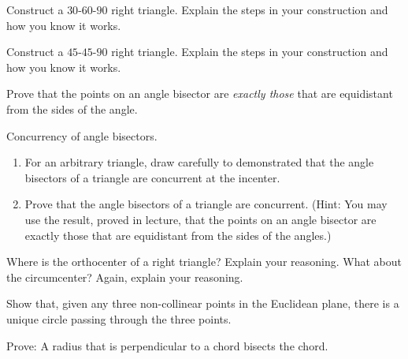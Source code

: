 
\begin{prob}
Construct a $30$-$60$-$90$ right triangle. Explain the steps in your
  construction and how you know it works.
\end{prob}

\begin{prob}
Construct a $45$-$45$-$90$ right triangle. Explain the steps in your
  construction and how you know it works.
\end{prob}

\begin{prob}
Prove that the points on an angle bisector are \emph{exactly those} that are equidistant from the sides of the angle. 
\end{prob}

\begin{prob} 
Concurrency of angle bisectors. 
\begin{enumerate}
\item For an arbitrary triangle, draw carefully to demonstrated that the angle bisectors of a triangle are concurrent at the incenter.   
\item Prove that the angle bisectors of a triangle are concurrent.  (Hint:  You may use the result, proved in lecture, that the points on an angle bisector are exactly those that are equidistant from the sides of the angles.)  
\end{enumerate}
\end{prob} 


\begin{prob}
Where is the orthocenter of a right triangle?  Explain your reasoning.  What about the circumcenter?  Again, explain your reasoning. 
\end{prob}

\begin{prob}
Show that, given any three non-collinear points in the Euclidean plane, there is a unique circle passing through the three points.
\end{prob}

\begin{prob}
Prove: A radius that is perpendicular to a chord bisects the chord. 
\end{prob}

